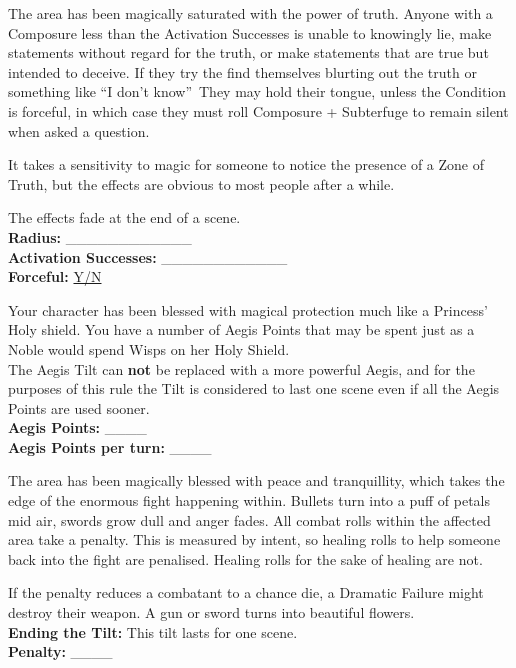 \documentclass[10pt, frontgrid, backgrid]{flacards}
\begin{document}
{The area has been magically saturated with the power of truth. Anyone with a Composure less than the Activation Successes is unable to knowingly lie, make statements without regard for the truth, or make statements that are true but intended to deceive. If they try the find themselves blurting out the truth or something like \textquotedblleft I don't know\textquotedblright\, They may hold their tongue, unless the Condition is forceful, in which case they must roll Composure + Subterfuge to remain silent when asked a question. 

It takes a sensitivity to magic for someone to notice the presence of a Zone of Truth, but the effects are obvious to most people after a while. 

The effects fade at the end of a scene.\\

\textbf{Radius:} \_\_\_\_\_\_\_\_\_\_\_\_ \\
\textbf{Activation Successes:} \_\_\_\_\_\_\_\_\_\_\_\_ \\
\textbf{Forceful:} \underline{Y/N}}












{Your character has been blessed with magical protection much like a Princess' Holy shield. You have a number of Aegis Points that may be spent just as a Noble would spend Wisps on her Holy Shield. \\

The Aegis Tilt can \textbf{not} be replaced with a more powerful Aegis, and for the purposes of this rule the Tilt is considered to last one scene even if all the Aegis Points are used sooner.\\

\textbf{Aegis Points:} \_\_\_\_\\
\textbf{Aegis Points per turn:} \_\_\_\_}

{The area has been magically blessed with peace and tranquillity, which takes the edge of the enormous fight happening within. Bullets turn into a puff of petals mid air, swords grow dull and anger fades. All combat rolls within the affected area take a penalty. This is measured by intent, so healing rolls to help someone back into the fight are penalised. Healing rolls for the sake of healing are not. 

If the penalty reduces a combatant to a chance die, a Dramatic Failure might destroy their weapon. A gun or sword turns into beautiful flowers. \\
\textbf{Ending the Tilt:} This tilt lasts for one scene. \\
\textbf{Penalty:} \_\_\_\_}
\end{document}
